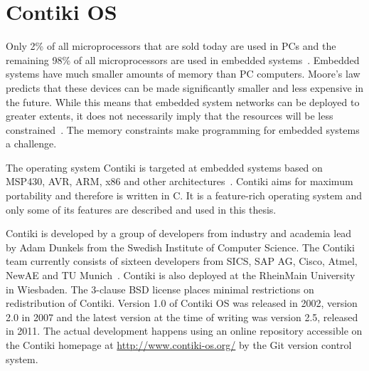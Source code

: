 
\chapter{Contiki OS}
Only 2\% of all microprocessors that are sold today are used in PCs and the remaining 98\%
of all microprocessors are used in embedded systems~\cite{thesis-programming}.
Embedded systems have much smaller amounts of memory than PC computers.
Moore's law predicts that these devices
can be made significantly smaller and less expensive in the future.
While this means that embedded system networks can
be deployed to greater extents, it does not necessarily imply
that the resources will be less constrained~\cite{paper-contiki}.
The memory constraints make programming for embedded systems a challenge.

The operating system Contiki is targeted at embedded systems based on MSP430, AVR, ARM, x86
and other architectures~\cite{contiki-docs}.
Contiki aims for maximum portability and therefore is written in C.
It is a feature-rich operating system and
only some of its features are described and used in this thesis.

Contiki is developed by a group of developers from industry and academia
lead by Adam Dunkels from the Swedish Institute of Computer Science.
The Contiki team currently consists of sixteen developers from SICS,
SAP AG, Cisco, Atmel, NewAE and TU Munich~\cite{contiki-docs}.
Contiki is also deployed at the RheinMain University in Wiesbaden.
The 3-clause BSD license places minimal restrictions on redistribution of Contiki.
Version 1.0 of Contiki OS was released in 2002, version 2.0 in 2007 and the latest version
at the time of writing was version 2.5, released in 2011.
The actual development happens using an online repository accessible
on the Contiki homepage at \url{http://www.contiki-os.org/}
by the Git version control system.










